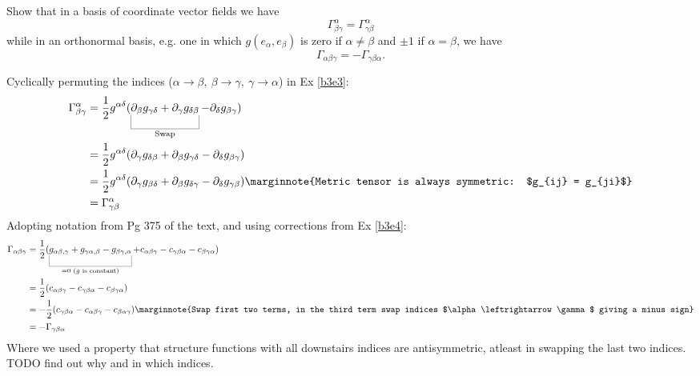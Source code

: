 \documentclass[10pt]{article}
\begin{document}
\begin{example}\label{b3e5}
	Show that in a basis of coordinate vector fields we have
	$$
	\Gamma_{\beta\gamma}^\alpha=\Gamma_{\gamma\beta}^\alpha
	$$
	while in an orthonormal basis, e.g. one in which $g(e_\alpha,e_\beta)$ is zero if $\alpha\ne\beta$ and $\pm 1$ if $\alpha=\beta$, we have
	$$
	\Gamma_{\alpha\beta\gamma}=-\Gamma_{\gamma\beta\alpha}.
	$$
\end{example}
\sol Cyclically permuting the indices ($\alpha \to \beta,\: \beta \to \gamma,\: \gamma \to \alpha$) in Ex \ref{b3e3}:
$$
\begin{aligned}
	\Gamma_{\beta\gamma}^\alpha &= \frac12 g^{\alpha\delta}(\ub{\partial_\beta g_{\gamma\delta}+\partial_\gamma g_{\delta\beta}}{\text{Swap}}-\partial_\delta g_{\beta\gamma})\\
	&= \frac12 g^{\alpha\delta}(\partial_\gamma g_{\delta\beta}+\partial_\beta g_{\gamma\delta}-\partial_\delta g_{\beta\gamma})\\
	&= \frac12 g^{\alpha\delta}(\partial_\gamma g_{\beta\delta}+\partial_\beta g_{\delta\gamma}-\partial_\delta g_{\gamma\beta})\marginnote{Metric tensor is always symmetric: $g_{ij} = g_{ji}$}\\
	&= \Gamma_{\gamma\beta}^\alpha
\end{aligned}
$$
Adopting notation from Pg 375 of the text, and using corrections from Ex \ref{b3e4}:
$$
\begin{aligned}
	\Gamma_{\alpha\beta\gamma} &= \frac12(\ub{g_{\alpha\beta,\gamma}+g_{\gamma\alpha,\beta}-g_{\beta\gamma,\alpha}}{= 0 \text{ ($g$ is constant)}}+c_{\alpha\beta\gamma}-c_{\gamma\beta\alpha}-c_{\beta\gamma\alpha})\\
	&= \frac12(c_{\alpha\beta\gamma}-c_{\gamma\beta\alpha}-c_{\beta\gamma\alpha})\\
	&= -\frac12(c_{\gamma\beta\alpha}-c_{\alpha\beta\gamma}-c_{\beta\alpha\gamma})\marginnote{Swap first two terms, in the third term swap indices $\alpha\leftrightarrow\gamma$ giving a minus sign}\\
	&= -\Gamma_{\gamma\beta\alpha}
\end{aligned}$$
Where we used a property that structure functions with all downstairs indices are antisymmetric, atleast in swapping the last two indices. TODO find out why and in which indices.
\end{document}
